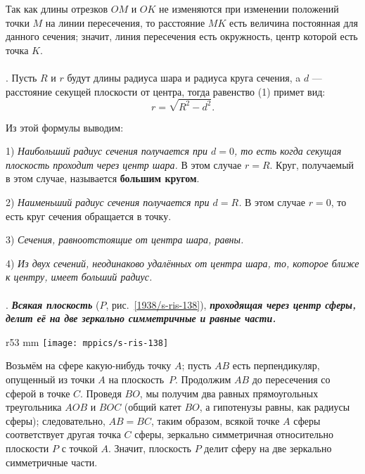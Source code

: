 Так как длины отрезков $OM$ и $OK$ не изменяются при изменении положений точки $M$ на линии пересечения, то расстояние $MK$ есть величина постоянная для данного сечения;
значит, линия пересечения есть окружность, центр которой есть точка $K$.

\paragraph{}\label{1938/s127}
.
Пусть $R$ и $r$ будут длины радиуса шара и радиуса круга сечения, a $d$ — расстояние секущей плоскости от центра, тогда равенство (1) примет вид: 
\[r= \sqrt{R^2 - d^2}.\]

Из этой формулы выводим:

1) \emph{Наибольший радиус сечения получается при $d=0$, то есть когда секущая плоскость проходит через центр шара.}
В этом случае $r=R$.
Круг, получаемый в этом случае, называется \textbf{большим кругом}.

2) \emph{Наименьший радиус сечения получается при $d=R$.}
В этом случае $r=0$, то есть круг сечения обращается в точку.

3) \emph{Сечения, равноотстоящие от центра шара, равны.}

4) \emph{Из двух сечений, неодинаково удалённых от центра шара, то, которое ближе к центру, имеет больший радиус.}

\paragraph{}\label{1938/s128}
.
\textbf{\emph{Всякая плоскость}} ($P$, рис.~\ref{1938/s-ris-138}), \textbf{\emph{проходящая через центр сферы, делит её на две зеркально симметричные и равные части.}}

\begin{wrapfigure}{r}{53 mm}
\vskip-0mm
\centering
\texttt{[image: mppics/s-ris-138]}
\caption{}\label{1938/s-ris-138}
\vskip-0mm
\end{wrapfigure}

Возьмём на сфере какую-нибудь точку $A$;
пусть $AB$ есть перпендикуляр, опущенный из точки $A$ на плоскость~$P$.
Продолжим $AB$ до пересечения со сферой в точке $C$.
Проведя $BO$, мы получим два равных прямоугольных треугольника $AOB$ и $BOC$ (общий катет $BO$, а гипотенузы равны, как радиусы сферы);
следовательно, $AB=BC$, таким образом, всякой точке $A$ сферы соответствует другая точка $C$ сферы, зеркально симметричная относительно плоскости $P$ с точкой $A$.
Значит, плоскость $P$ делит сферу на две зеркально симметричные части.

